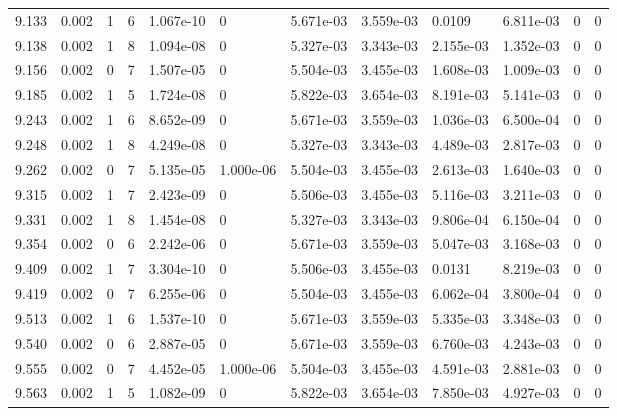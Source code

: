 \documentclass[preview]{standalone}
\begin{document}
{{{{{{{\begin{tabular}{L{1.2cm}C{1.2cm} C{0.3cm}C{0.5cm} C{1.4cm}C{1.4cm} C{1.4cm}C{1.4cm} C{1.6cm}C{1.6cm} C{1.6cm}C{1.6cm}}
  9.133  &  0.002  & 1     &  6 &  1.067e-10  & 0  &  5.671e-03&   3.559e-03& 0.0109 & 6.811e-03   &  0 & 0  \\ 
  9.138  &  0.002  & 1     &  8 &  1.094e-08  & 0  &  5.327e-03&   3.343e-03& 2.155e-03 & 1.352e-03   &  0 & 0  \\ 
  9.156  &  0.002  & 0     &  7 &  1.507e-05  & 0  &  5.504e-03&   3.455e-03& 1.608e-03 & 1.009e-03   &  0 & 0  \\ 
  9.185  &  0.002  & 1     &  5 &  1.724e-08  & 0  &  5.822e-03&   3.654e-03& 8.191e-03 & 5.141e-03   &  0 & 0  \\ 
  9.243  &  0.002  & 1     &  6 &  8.652e-09  & 0  &  5.671e-03&   3.559e-03& 1.036e-03 & 6.500e-04   &  0 & 0  \\ 
  9.248  &  0.002  & 1     &  8 &  4.249e-08  & 0  &  5.327e-03&   3.343e-03& 4.489e-03 & 2.817e-03   &  0 & 0  \\ 
  9.262  &  0.002  & 0     &  7 &  5.135e-05  & 1.000e-06  &  5.504e-03&   3.455e-03& 2.613e-03 & 1.640e-03   &  0 & 0  \\ 
  9.315  &  0.002  & 1     &  7 &  2.423e-09  & 0  &  5.506e-03&   3.455e-03& 5.116e-03 & 3.211e-03   &  0 & 0  \\ 
  9.331  &  0.002  & 1     &  8 &  1.454e-08  & 0  &  5.327e-03&   3.343e-03& 9.806e-04 & 6.150e-04   &  0 & 0  \\ 
  9.354  &  0.002  & 0     &  6 &  2.242e-06  & 0  &  5.671e-03&   3.559e-03& 5.047e-03 & 3.168e-03   &  0 & 0  \\ 
  9.409  &  0.002  & 1     &  7 &  3.304e-10  & 0  &  5.506e-03&   3.455e-03& 0.0131 & 8.219e-03   &  0 & 0  \\ 
  9.419  &  0.002  & 0     &  7 &  6.255e-06  & 0  &  5.504e-03&   3.455e-03& 6.062e-04 & 3.800e-04   &  0 & 0  \\ 
  9.513  &  0.002  & 1     &  6 &  1.537e-10  & 0  &  5.671e-03&   3.559e-03& 5.335e-03 & 3.348e-03   &  0 & 0  \\ 
  9.540  &  0.002  & 0     &  6 &  2.887e-05  & 0  &  5.671e-03&   3.559e-03& 6.760e-03 & 4.243e-03   &  0 & 0  \\ 
  9.555  &  0.002  & 0     &  7 &  4.452e-05  & 1.000e-06  &  5.504e-03&   3.455e-03& 4.591e-03 & 2.881e-03   &  0 & 0  \\ 
  9.563  &  0.002  & 1     &  5 &  1.082e-09  & 0  &  5.822e-03&   3.654e-03& 7.850e-03 & 4.927e-03   &  0 & 0  \\ 
\hline 
\end{tabular} 

}}}}}}}
\end{document}
